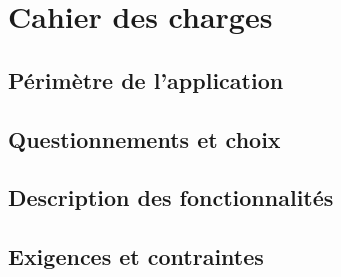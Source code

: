 \section{Cahier des charges}

\subsection{Périmètre de l'application}

\subsection{Questionnements et choix}

\subsection{Description des fonctionnalités}

\subsection{Exigences et contraintes}
